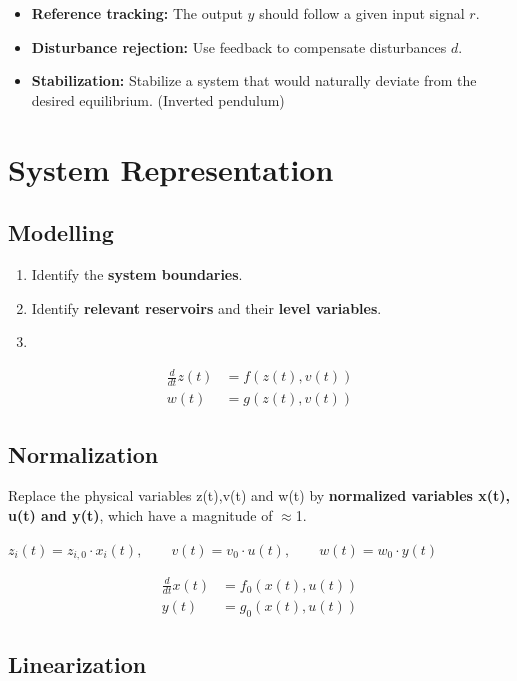 \documentclass[10pt,a4paper]{scrartcl}
\begin{document}
\begin{multicols*}{3}
	\begin{itemize}
	\compaq
	\item \textbf{Reference tracking:}
	The output $y$ should follow a given input signal $r$.
	\item \textbf{Disturbance rejection:}
	Use feedback to compensate disturbances $d$.
	\item \textbf{Stabilization:}
	Stabilize a system that would naturally deviate from the desired equilibrium. (Inverted pendulum)
	\end{itemize}
		
	\section{System Representation}
	
	\subsection{Modelling}
	\begin{enumerate}
	\compaq
	\item
	Identify the \textbf{system boundaries}.
	\item
	Identify \textbf{relevant reservoirs} and their \textbf{level variables}.
	\item
	\end{enumerate}
	
	\begin{align*}
	\frac{d}{dt}z(t)&=f(z(t),v(t))\\
	w(t)&=g(z(t),v(t))
	\end{align*}
	
	\subsection{Normalization}
	Replace the physical variables z(t),v(t) and w(t) by \textbf{normalized variables x(t), u(t) and y(t)}, which have a magnitude of $\approx$1.
	
	$z_i(t)=z_{i,0}\cdot x_i(t),\qquad v(t)=v_0\cdot u(t),\qquad w(t)=w_0\cdot y(t)$
	
	\begin{align*}
	\frac{d}{dt}x(t)&=f_0(x(t),u(t))\\
	y(t)&=g_0(x(t),u(t))
	\end{align*}
	
	\subsection{Linearization}
	

\end{multicols*}
\end{document}
